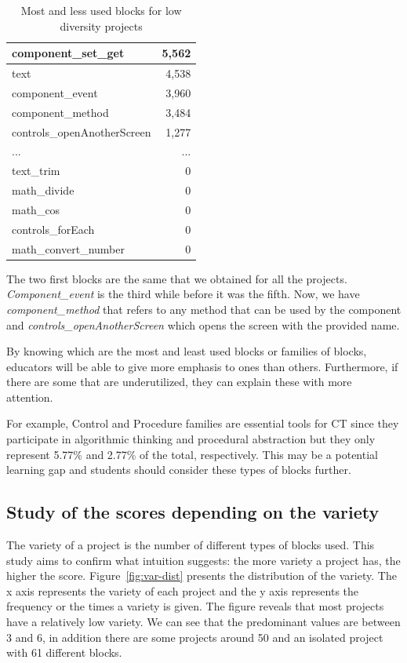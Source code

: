\documentclass[a4paper]{article}
\begin{document}
\begin{table}[ht]
\begin{center}
\caption{Most and less used blocks for low diversity projects}
\bigskip
\label{tab:most-least-low}
\begin{tabular}{|l|r|}
\hline
component\_set\_get & 5,562\\ \hline
text & 4,538\\ \hline
component\_event & 3,960\\ \hline
component\_method & 3,484\\ \hline
controls\_openAnotherScreen & 1,277\\ \hline
... & ... \\ \hline
text\_trim & 0\\ \hline
math\_divide & 0\\ \hline
math\_cos & 0\\ \hline
controls\_forEach & 0\\ \hline
math\_convert\_number & 0\\ \hline
\end{tabular}
\end{center}
\end{table}

The two first blocks are the same that we obtained for all the projects. \emph{Component\_event} is the third while before it was the fifth. Now, we have \emph{component\_method} that refers to any method that can be used by the component and \emph{controls\_openAnotherScreen} which opens the screen with the provided name.

By knowing which are the most and least used blocks or families of blocks, educators will be able to give more emphasis to ones than others. Furthermore, if there are some that are underutilized, they can explain these with more attention.

For example, Control and Procedure families are essential tools for CT since they participate in algorithmic thinking and procedural abstraction but they only represent 5.77\% and 2.77\% of the total, respectively. This may be a potential learning gap and students should consider these types of blocks further.

\subsection{Study of the scores depending on the variety}

The variety of a project is the number of different types of blocks used. This study aims to confirm what intuition suggests: the more variety a project has, the higher the score. 
Figure~\ref{fig:var-dist} presents the distribution of the variety. The x axis represents the variety of each project and the y axis represents the frequency or the times a variety is given. The figure reveals that most projects have a relatively low variety. We can see that the predominant values are between 3 and 6, in addition there are some projects around 50 and an isolated project with 61 different blocks. 
\end{document}
